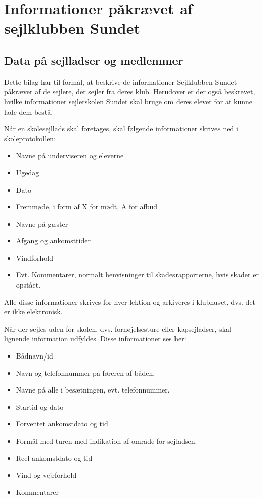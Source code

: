 \chapter{Informationer påkrævet af sejlklubben Sundet}\label{bilag:sundet}
\section{Data på sejlladser og medlemmer}

Dette bilag har til formål, at beskrive de informationer Sejlklubben Sundet påkræver af de sejlere, der sejler fra deres klub. 
Herudover er der også beskrevet, hvilke informationer sejlerskolen Sundet skal bruge om deres elever for at kunne lade dem bestå.

Når en skolesejllads skal foretages, skal følgende informationer skrives ned i skoleprotokollen:

\begin{itemize}
	\item Navne på underviseren og eleverne
	\item Ugedag
	\item Dato
	\item Fremmøde, i form af X for mødt, A for afbud
	\item Navne på gæster
	\item Afgang og ankomsttider
	\item Vindforhold
	\item Evt. Kommentarer, normalt henvisninger til skadesrapporterne, hvis skader er opstået.
\end{itemize}

Alle disse informationer skrives for hver lektion og arkiveres i klubhuset, dvs. det er ikke elektronisk.

Når der sejles uden for skolen, dvs. fornøjelsesture eller kapsejladser, skal lignende information udfyldes. 
Disse informationer ses her:

\begin{itemize}
	\item Bådnavn/id
	\item Navn og telefonnummer på føreren af båden.
	\item Navne på alle i besætningen, evt. telefonnummer.
	\item Startid og dato
	\item Forventet ankomstdato og tid
	\item Formål med turen med indikation af område for sejladsen.
	\item Reel ankomstdato og tid
	\item Vind og vejrforhold
	\item Kommentarer
\end{itemize}

